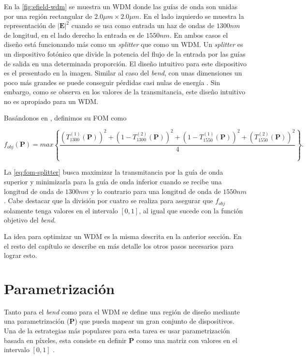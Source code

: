 En la \autoref{fig:efield-wdm} se muestra un WDM donde las guías de onda son unidas por una región rectangular
de $2.0\mu m \times 2.0 \mu m$. En el lado izquierdo se muestra la representación de $|\boldsymbol{E}|^2$ cuando se usa 
como entrada un haz de ondas de $1300 nm$ de longitud, en el lado derecho la entrada es de $1550 nm$.
En ambos casos el diseño está funcionando más como un \emph{splitter} que como un WDM.
Un \emph{splitter} es un dispositivo fotónico que divide la potencia del flujo de la entrada por las guías
de salida en una determinada proporción. El diseño intuitivo para este dispositivo es el presentado en la imagen. Similar al caso del
\emph{bend}, con unas dimensiones un poco más grandes se puede conseguir pérdidas casi nulas de energía
\citep{LukasChrostowski2010}.
Sin embargo, como se observa en los valores de la transmitancia, este diseño intuitivo no es apropiado para un WDM.

Basándonos en \cite{Su2020}, definimos su FOM como

\begin{equation}
  f_{obj}(\boldsymbol{P}) = max \left \{ \frac{\left ( T_{1300}^{(1)}(\boldsymbol{P}) \right )^2  + 
                            \left ( 1 - T_{1300}^{(2)}(\boldsymbol{P}) \right )^2 +
                            \left ( 1 - T_{1550}^{(1)}(\boldsymbol{P}) \right )^2  + 
                            \left ( T_{1550}^{(2)}(\boldsymbol{P}) \right )^2 }{4}
                    \right \}.
\label{eq:fom-splitter}
\end{equation}

La \autoref{eq:fom-splitter} busca maximizar la transmitancia por la guía de onda superior y minimizarla para
la guía de onda inferior cuando se recibe una longitud de onda de $1300 nm$ y lo contrario para una longitud
de onda de $1550 nm$. Cabe destacar que la división por cuatro se realiza para asegurar que $f_{obj}$ solamente
tenga valores en el intervalo $[0, 1]$, al igual que sucede con la función objetivo del \emph{bend}.

La idea para optimizar un WDM es la misma descrita en la anterior sección. 
En el resto del capítulo se describe en más detalle los otros pasos necesarios para lograr esto.

\section{Parametrización}\label{sec:parametrization}

Tanto para el \emph{bend} como para el WDM se define una región de diseño
mediante una parametrización ($\boldsymbol{P}$) que pueda mapear un gran conjunto de dispositivos.
Una de la estrategias más populares para esta tarea es usar parametrización
basada en píxeles, esta consiste en definir $\boldsymbol{P}$ como una matriz con valores en el intervalo
$[0, 1]$ \citep{Molesky2018}.

